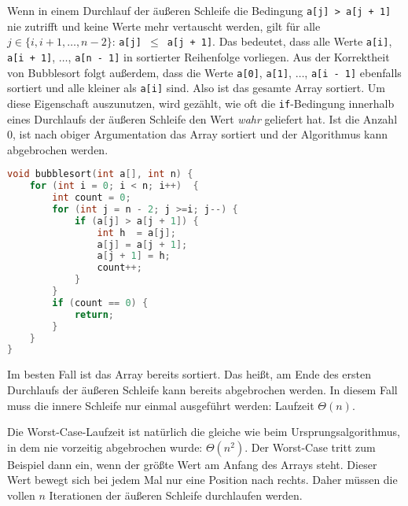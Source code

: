 \documentclass[11pt,a4paper]{article}
\begin{document}
\begin{loesung}
\begin{enumerate}
        Wenn in einem Durchlauf der äußeren Schleife die Bedingung \texttt{a[j] > a[j + 1]} nie zutrifft und keine Werte mehr vertauscht werden, gilt für alle $j \in \{i, i + 1, \ldots, n - 2\}$: \texttt{a[j] }$\leq$\texttt{ a[j + 1]}.
        Das bedeutet, dass alle Werte \texttt{a[i]}, \texttt{a[i + 1]}, $\ldots$, \texttt{a[n - 1]} in sortierter Reihenfolge vorliegen.
        Aus der Korrektheit von Bubblesort folgt außerdem, dass die Werte \texttt{a[0]}, \texttt{a[1]}, $\ldots$, \texttt{a[i - 1]} ebenfalls sortiert und alle kleiner als \texttt{a[i]} sind.
        Also ist das gesamte Array sortiert.
        Um diese Eigenschaft auszunutzen, wird gezählt, wie oft die \texttt{if}-Bedingung innerhalb eines Durchlaufs der äußeren Schleife den Wert \textit{wahr} geliefert hat.
        Ist die Anzahl 0, ist nach obiger Argumentation das Array sortiert und der Algorithmus kann abgebrochen werden.
        \begin{lstlisting}[language=c++]
void bubblesort(int a[], int n) {
    for (int i = 0; i < n; i++)  {
        int count = 0;
        for (int j = n - 2; j >=i; j--) {
            if (a[j] > a[j + 1]) {
                int h  = a[j];
                a[j] = a[j + 1];
                a[j + 1] = h;
                count++;
            }
        }
        if (count == 0) {
            return;
        }
    }
} 
        \end{lstlisting}
        Im besten Fall ist das Array bereits sortiert.
        Das heißt, am Ende des ersten Durchlaufs der äußeren Schleife kann bereits abgebrochen werden.
        In diesem Fall muss die innere Schleife nur einmal ausgeführt werden: Laufzeit $\Theta(n)$.

        Die Worst-Case-Laufzeit ist natürlich die gleiche wie beim Ursprungsalgorithmus, in dem nie vorzeitig abgebrochen wurde: $\Theta(n^2)$.
        Der Worst-Case tritt zum Beispiel dann ein, wenn der größte Wert am Anfang des Arrays steht.
        Dieser Wert bewegt sich bei jedem Mal nur eine Position nach rechts.
        Daher müssen die vollen $n$ Iterationen der äußeren Schleife durchlaufen werden.
    \end{enumerate}
\end{loesung}

\end{document}
